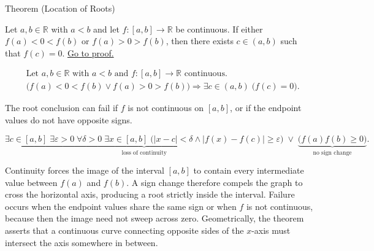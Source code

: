 
\begin{theorembox}{Theorem (Location of Roots)}
\begin{theorem}
\label{thm:location-of-roots}
Let $a,b \in \mathbb{R}$ with $a<b$ and let $f:[a,b]\to\mathbb{R}$ be continuous. If either $f(a)<0<f(b)$ or $f(a)>0>f(b)$, then there exists $c\in(a,b)$ such that $f(c)=0$.
\hyperref[prf:location-of-roots]{Go to proof.}
\end{theorem}
\end{theorembox}

\begin{remark*}
\[
\begin{aligned}
&\text{Let } a,b \in \mathbb{R} \text{ with } a<b \text{ and } f:[a,b]\to\mathbb{R} \text{ continuous.}\\
&\bigl(f(a)<0<f(b) \lor f(a)>0>f(b)\bigr) \Rightarrow \exists c \in (a,b)\; \bigl(f(c)=0\bigr).
\end{aligned}
\]
\end{remark*}

\begin{remark*}
The root conclusion can fail if $f$ is not continuous on $[a,b]$, or if
the endpoint values do not have opposite signs.
\end{remark*}

\begin{remark*}
\[
\underbrace{\exists c\in[a,b]\;\exists \varepsilon>0\;\forall \delta>0\;\exists x\in[a,b]\;
\bigl(|x-c|<\delta\land |f(x)-f(c)|\ge\varepsilon\bigr)}_{\text{loss of continuity}}
\;\lor\;
\underbrace{\bigl(f(a)f(b)\ge 0\bigr)}_{\text{no sign change}}.
\]
\end{remark*}

\begin{remark*}[Interpretation]
Continuity forces the image of the interval $[a,b]$ to contain every intermediate value between $f(a)$ and $f(b)$. A sign change therefore compels the graph to cross the horizontal axis, producing a root strictly inside the interval. Failure occurs when the endpoint values share the same sign or when $f$ is not continuous, because then the image need not sweep across zero. Geometrically, the theorem asserts that a continuous curve connecting opposite sides of the $x$-axis must intersect the axis somewhere in between.
\end{remark*}

